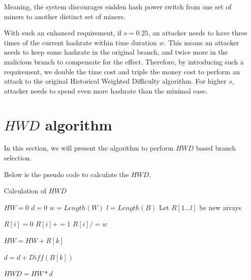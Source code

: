 \documentclass[conference]{IEEEtran}
\begin{document}
Meaning, the system discourages sudden hash power switch from one set of miners to another distinct set of miners.

With such an enhanced requirement, if $s=0.25$, an attacker needs to have three times of the current hashrate within time duration $w$. This means an attacker needs to keep some hashrate in the original branch, and twice more in the malicious branch to compensate for the effect. Therefore, by introducing such a requirement, we double the time cost and triple the money cost to perform an attack to the original Historical Weighted Difficulty algorithm. For higher $s$, attacker needs to spend even more hashrate than the minimal case. 

\section{$H\!W\!D$ algorithm}
In this section, we will present the algorithm to perform $H\!W\!D$ based branch selection.

Below is the pseudo code to calculate the $H\!W\!D$,

\makeatletter
\def\BState{\State\hskip-\ALG@thistlm}
\makeatother

\begin{algorithm}
\caption{Calculation of $H\!W\!D$}\label{euclid}
\begin{algorithmic}[1]
    \State ${H\!W} = 0$
    \State $d = 0$
    \State $w = Length(W)$
    \State $l = Length(B)$
    \State Let $R[1 \ldots l]$ be new arrays
    
        \State $R[i] = 0$
                \State $R[i] += 1$
            \EndIf
            \State $R[i] /= w$
        \EndFor
    \EndFor

        \State ${H\!W} = {H\!W} + R[k]$
    \EndFor

        \State $d = d + Diff(B[k])$
    \EndFor

    \State ${H\!W\!D} = {H\!W} * d$
\EndFunction
\end{algorithmic}
\end{algorithm}
\end{document}
